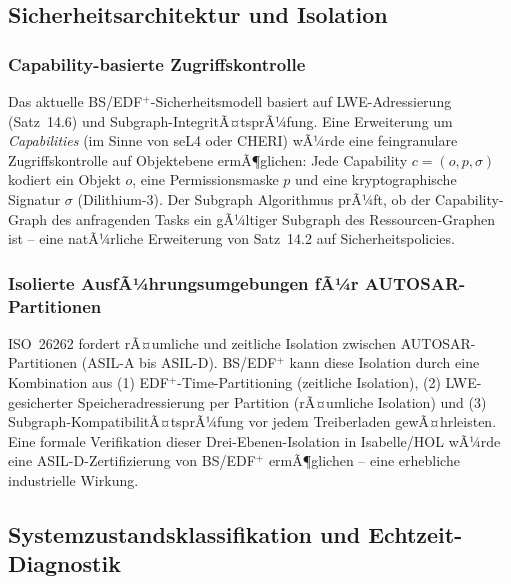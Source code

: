 ﻿\documentclass[a4paper,12pt]{scrreprt}
\theoremstyle{definition}
\begin{document}
	\subsection{Sicherheitsarchitektur und Isolation}
	
	\subsubsection{Capability-basierte Zugriffskontrolle}
	
	Das aktuelle BS/EDF$^+$-Sicherheitsmodell basiert auf LWE-Adressierung
	(Satz~14.6) und Subgraph-IntegritÃ¤tsprÃ¼fung. Eine Erweiterung um
	\emph{Capabilities} (im Sinne von seL4 oder CHERI) wÃ¼rde eine
	fein\-granulare Zugriffskontrolle auf Objekt\-ebene ermÃ¶glichen:
	Jede Capability $c = (o, p, \sigma)$ kodiert ein Objekt $o$,
	eine Permissionsmaske $p$ und eine kryptographische Signatur $\sigma$
	(Dilithium-3). Der Subgraph Algorithmus prÃ¼ft, ob der Capability-Graph
	des anfragenden Tasks ein gÃ¼ltiger Subgraph des Ressourcen-Graphen ist --
	eine natÃ¼rliche Erweiterung von Satz~14.2 auf Sicherheitspolicies.
	
	\subsubsection{Isolierte AusfÃ¼hrungsumgebungen fÃ¼r AUTOSAR-Partitionen}
	
	ISO~26262 \cite{ISO26262} fordert rÃ¤umliche und zeitliche
	Isolation zwischen AUTOSAR-Partitionen (ASIL-A bis ASIL-D).
	BS/EDF$^+$ kann diese Isolation durch eine Kombination aus
	(1) EDF$^+$-Time-Partitioning (zeitliche Isolation),
	(2) LWE-gesicherter Speicheradressierung per Partition (rÃ¤umliche Isolation)
	und (3) Subgraph-KompatibilitÃ¤tsprÃ¼fung vor jedem Treiberladen gewÃ¤hrleisten.
	Eine formale Verifikation dieser Drei-Ebenen-Isolation in Isabelle/HOL
	wÃ¼rde eine ASIL-D-Zertifizierung von BS/EDF$^+$ ermÃ¶glichen --
	eine erhebliche industrielle Wirkung.
	
	\subsection{Systemzustandsklassifikation und Echtzeit-Diagnostik}
	
\end{document}

